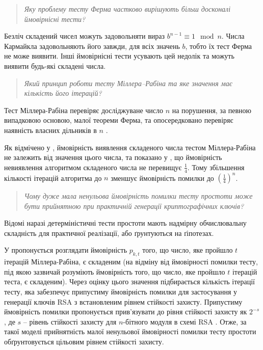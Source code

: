 \documentclass{kpi-lab}
\begin{document}
\begin{quote}\small\it
  Яку проблему тесту Ферма частково вирішують більш
  досконалі ймовірнісні тести?
\end{quote}

Безліч складений чисел можуть задовольняти вираз \(b^{n-1}
\equiv 1 \mod n\).
Числа Кармайкла задовольняють його завжди, для всіх значень
\(b\), тобто їх тест Ферма не може виявити.
Інші ймовірнісні тести усувають цей недолік та можуть виявити
будь-які складені числа.

\begin{quote}\small\it
  Який принцип роботи тесту Міллера–Рабіна та яке значення
  має кількість його ітерацій?
\end{quote}

Тест Міллера-Рабіна перевіряє досліджуване число \(n\)
на порушення, за певною випадковою основою, малої теореми Ферма,
та опосередковано перевіряє наявність власних дільників в
\(n\) \cite{Rabin1980}.

Як відмічено у \cite[][\pagename 395]{Knuth2021}, ймовірність
виявлення складеного числа тестом Міллера-Рабіна
не залежить від значення цього числа,
та показано у \cite{Rabin1980}, що ймовірність невиявлення алгоритмом
складеного числа не перевищує \(\frac{1}{4}\).
Тому збільшення кількості ітерацій алгоритма до \(n\)
зменшує ймовірність помилки до \(\left(\frac{1}{4}\right)^n\).

\begin{quote}\small\it
  Чому дуже мала ненульова ймовірність помилки тесту
  простоти може бути прийнятною при практичній генерації
  криптографічних ключів?
\end{quote}

Відомі наразі детерміністичні тести простоти
мають надмірну обчислювальну складність для практичної реалізації,
або ґрунтуються на ґіпотезах.

У \cite{2023} пропонується розглядати
ймовірність \(p_{k,t}\) того, що число, яке пройшло \(t\)
ітерацій Міллера-Рабіна, є складеним (на відміну від
  ймовірності помилки тесту, під якою зазвичай розуміють
  ймовірність того, що число, яке пройшло \(t\) ітерацій
теста, є складеним).
Через оцінку цього значення підбирається кількість ітерації
тесту, яка забезпечує
припустиму ймовірність помилки для застосування у генерації ключів RSA
з встановленим рівнем стійкості захисту. Припустиму
ймовірність помилки пропонується прив'язувати до рівня
стійкості захисту як \(2^{-s}\), де \(s\) -- рівень
стійкості захисту для \(n\)-бітного модуля в схемі RSA
\cite[][\pagename 73]{2023}.
Отже, за такої моделі прийнятність малої ненульової
ймовірності помилки тесту простоти обґрунтовується цільовим
рівнем стійкості захисту.
\end{document}
